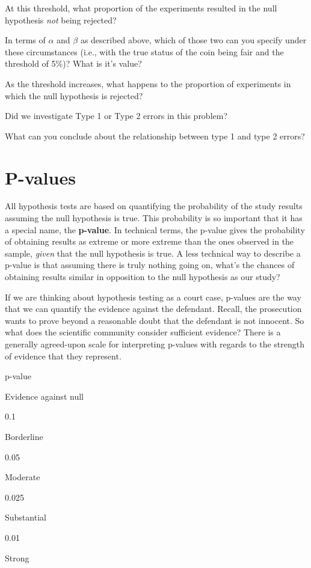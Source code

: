\documentclass[
]{book}
\theoremstyle{definition}
\theoremstyle{definition}
\theoremstyle{definition}
\theoremstyle{remark}
\begin{document}
At this threshold, what proportion of the experiments resulted in the null hypothesis \emph{not} being rejected?

In terms of \(\alpha\) and \(\beta\) as described above, which of those two can you specify under these circumstances (i.e., with the true status of the coin being fair and the threshold of 5\%)? What is it's value?

As the threshold increases, what happens to the proportion of experiments in which the null hypothesis is rejected?

Did we investigate Type 1 or Type 2 errors in this problem?

What can you conclude about the relationship between type 1 and type 2 errors?

\hypertarget{ch7_s3}{%
\section{P-values}\label{ch7_s3}}

All hypothesis tests are based on quantifying the probability of the study results assuming the null hypothesis is true. This probability is so important that it has a special name, the \textbf{p-value}. In technical terms, the p-value gives the probability of obtaining results as extreme or more extreme than the ones observed in the sample, \emph{given} that the null hypothesis is true. A less technical way to describe a p-value is that assuming there is truly nothing going on, what's the chances of obtaining results similar in opposition to the null hypothesis as our study?

If we are thinking about hypothesis testing as a court case, p-values are the way that we can quantify the evidence against the defendant. Recall, the prosecution wants to prove beyond a reasonable doubt that the defendant is not innocent. So what does the scientific community consider sufficient evidence? There is a generally agreed-upon scale for interpreting p-values with regards to the strength of evidence that they represent.

p-value

Evidence against null

0.1

Borderline

0.05

Moderate

0.025

Substantial

0.01

Strong
\end{document}
